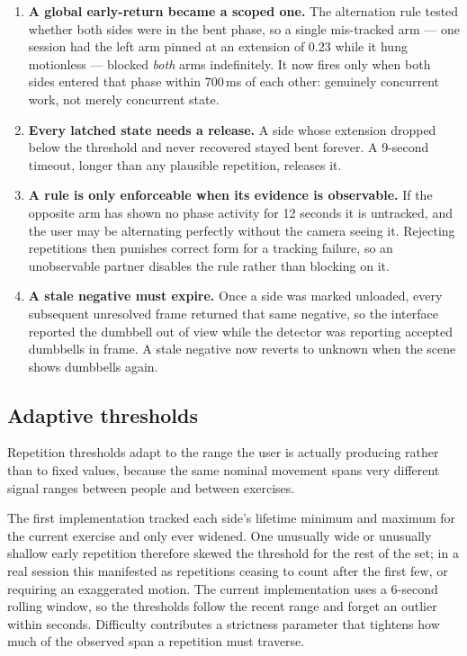 \documentclass[11pt,a4paper]{article}
\begin{document}
\begin{enumerate}
\item \textbf{A global early-return became a scoped one.} The alternation rule
tested whether both sides were in the bent phase, so a single mis-tracked arm
--- one session had the left arm pinned at an extension of 0.23 while it hung
motionless --- blocked \emph{both} arms indefinitely. It now fires only when
both sides entered that phase within 700\,ms of each other: genuinely
concurrent work, not merely concurrent state.

\item \textbf{Every latched state needs a release.} A side whose extension
dropped below the threshold and never recovered stayed bent forever. A 9-second
timeout, longer than any plausible repetition, releases it.

\item \textbf{A rule is only enforceable when its evidence is observable.} If
the opposite arm has shown no phase activity for 12 seconds it is untracked, and
the user may be alternating perfectly without the camera seeing it. Rejecting
repetitions then punishes correct form for a tracking failure, so an
unobservable partner disables the rule rather than blocking on it.

\item \textbf{A stale negative must expire.} Once a side was marked unloaded,
every subsequent unresolved frame returned that same negative, so the interface
reported the dumbbell out of view while the detector was reporting accepted
dumbbells in frame. A stale negative now reverts to unknown when the scene
shows dumbbells again.
\end{enumerate}

\subsection{Adaptive thresholds}

Repetition thresholds adapt to the range the user is actually producing rather
than to fixed values, because the same nominal movement spans very different
signal ranges between people and between exercises.

The first implementation tracked each side's lifetime minimum and maximum for
the current exercise and only ever widened. One unusually wide or unusually
shallow early repetition therefore skewed the threshold for the rest of the set;
in a real session this manifested as repetitions ceasing to count after the
first few, or requiring an exaggerated motion. The current implementation uses a
6-second rolling window, so the thresholds follow the recent range and forget an
outlier within seconds. Difficulty contributes a strictness parameter that
tightens how much of the observed span a repetition must traverse.
\end{document}
